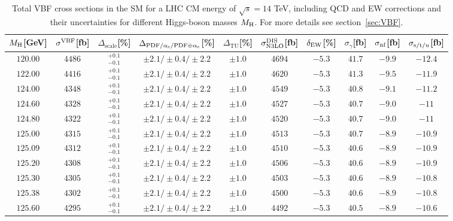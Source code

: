 \begin{table}[ht!]
\caption{Total VBF cross sections in the SM for a LHC CM energy of $\sqrt{s}=14$ TeV, including QCD and EW corrections
and their uncertainties for different Higgs-boson masses $M_\mathrm{H}$. For more details see section~\ref{sec:VBF}.}
\label{tab:vbf_XStot_14}
\begin{center}%
\begin{small}%
\begin{tabular}{cccccccc|cc}%
\toprule
$M_\mathrm{H}$[GeV] & $\sigma^{\mathrm{VBF}}$[fb] & $\Delta_{\mathrm{scale}}$[\%] & $\Delta_{\mathrm{PDF}/\alpha_{\mathrm{s}}/\mathrm{PDF\oplus\alpha_{\mathrm{s}}}}$[\%] & $\Delta_{\mathrm{TU}}$[\%] &
$\sigma_{\mathrm{N3LO}}^{\mathrm{DIS}}$[fb] & $\delta_{\mathrm{EW}}$[\%] & $\sigma_{\gamma}$[fb] & $\sigma_{\mbox{\scriptsize nf}}$[fb] & $\sigma_{\mbox{\scriptsize s/t/u}}$[fb]
\\
\midrule
$120.00$ & $4486$ & $^{+0.1}_{-0.1}$ & $\pm 2.1/\pm 0.4/\pm 2.2$ & $\pm 1.0$ & $4694$ & $-5.3$ & $41.7$ & $-9.9$ & $-12.4$ \\
$122.00$ & $4416$ & $^{+0.1}_{-0.1}$ & $\pm 2.1/\pm 0.4/\pm 2.2$ & $\pm 1.0$ & $4620$ & $-5.3$ & $41.3$ & $-9.5$ & $-11.9$ \\
$124.00$ & $4348$ & $^{+0.1}_{-0.1}$ & $\pm 2.1/\pm 0.4/\pm 2.2$ & $\pm 1.0$ & $4549$ & $-5.3$ & $40.8$ & $-9.1$ & $-11.2$ \\
$124.60$ & $4328$ & $^{+0.1}_{-0.1}$ & $\pm 2.1/\pm 0.4/\pm 2.2$ & $\pm 1.0$ & $4527$ & $-5.3$ & $40.7$ & $-9.0$ & $-11  $ \\
$124.80$ & $4322$ & $^{+0.1}_{-0.1}$ & $\pm 2.1/\pm 0.4/\pm 2.2$ & $\pm 1.0$ & $4520$ & $-5.3$ & $40.7$ & $-9.0$ & $-11  $ \\
$125.00$ & $4315$ & $^{+0.1}_{-0.1}$ & $\pm 2.1/\pm 0.4/\pm 2.2$ & $\pm 1.0$ & $4513$ & $-5.3$ & $40.7$ & $-8.9$ & $-10.9$ \\
$125.09$ & $4312$ & $^{+0.1}_{-0.1}$ & $\pm 2.1/\pm 0.4/\pm 2.2$ & $\pm 1.0$ & $4510$ & $-5.3$ & $40.6$ & $-8.9$ & $-10.9$ \\
$125.20$ & $4308$ & $^{+0.1}_{-0.1}$ & $\pm 2.1/\pm 0.4/\pm 2.2$ & $\pm 1.0$ & $4506$ & $-5.3$ & $40.6$ & $-8.9$ & $-10.9$ \\
$125.30$ & $4305$ & $^{+0.1}_{-0.1}$ & $\pm 2.1/\pm 0.4/\pm 2.2$ & $\pm 1.0$ & $4503$ & $-5.3$ & $40.6$ & $-8.9$ & $-10.8$ \\
$125.38$ & $4302$ & $^{+0.1}_{-0.1}$ & $\pm 2.1/\pm 0.4/\pm 2.2$ & $\pm 1.0$ & $4500$ & $-5.3$ & $40.6$ & $-8.9$ & $-10.8$ \\
$125.60$ & $4295$ & $^{+0.1}_{-0.1}$ & $\pm 2.1/\pm 0.4/\pm 2.2$ & $\pm 1.0$ & $4492$ & $-5.3$ & $40.5$ & $-8.9$ & $-10.6$ \\

\end{tabular}
\end{small}
\end{center}
\end{table}
